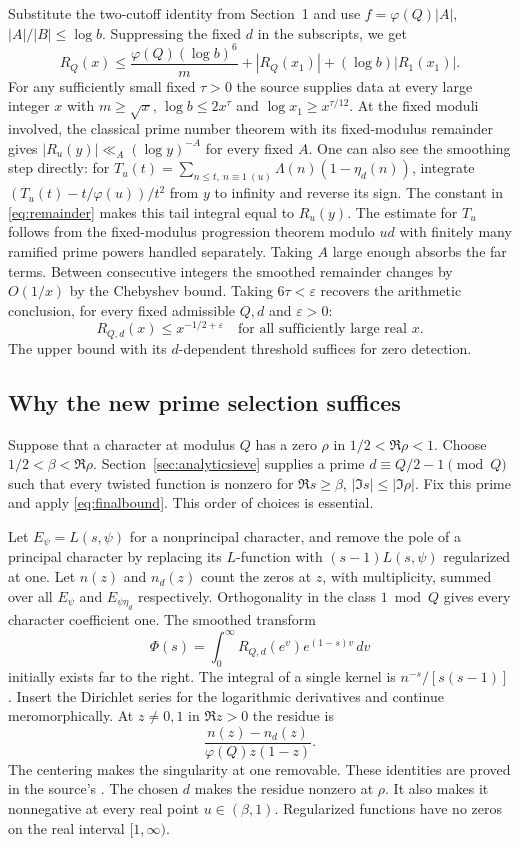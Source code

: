 Substitute the two-cutoff identity from Section~1 and use $f=\varphi(Q)|A|$, $|A|/|B|\le\log b$. Suppressing the fixed $d$ in the subscripts, we get
\[
 R_Q(x)\le\frac{\varphi(Q)(\log b)^6}{m}
                 +|R_Q(x_1)|+(\log b)|R_1(x_1)|.
\]
For any sufficiently small fixed $\tau>0$ the source supplies data at every large integer $x$ with $m\ge\sqrt x$, $\log b\le 2x^\tau$ and $\log x_1\ge x^{\tau/12}$. At the fixed moduli involved, the classical prime number theorem with its fixed-modulus remainder gives $|R_u(y)|\ll_A(\log y)^{-A}$ for every fixed $A$. One can also see the smoothing step directly: for $T_u(t)=\sum_{n\le t,\ n\equiv1\ (u)}\Lambda(n)(1-\eta_d(n))$, integrate $(T_u(t)-t/\varphi(u))/t^2$ from $y$ to infinity and reverse its sign. The constant in \eqref{eq:remainder} makes this tail integral equal to $R_u(y)$. The estimate for $T_u$ follows from the fixed-modulus progression theorem modulo $ud$ with finitely many ramified prime powers handled separately. Taking $A$ large enough absorbs the far terms. Between consecutive integers the smoothed remainder changes by $O(1/x)$ by the Chebyshev bound. Taking $6\tau<\varepsilon$ recovers the arithmetic conclusion, for every fixed admissible $Q,d$ and $\varepsilon>0$:
\begin{equation}
                  R_{Q,d}(x)\le x^{-1/2+\varepsilon}
                     \quad\text{for all sufficiently large real }x.
 \label{eq:finalbound}
\end{equation}
The upper bound with its $d$-dependent threshold suffices for zero detection.

\subsection*{Why the new prime selection suffices}
Suppose that a character at modulus $Q$ has a zero $\rho$ in $1/2<\Re\rho<1$. Choose $1/2<\beta<\Re\rho$. Section~\ref{sec:analyticsieve} supplies a prime $d\equiv Q/2-1\pmod Q$ such that every twisted function is nonzero for $\Re s\ge\beta$, $|\Im s|\le |\Im\rho|$. Fix this prime and apply \eqref{eq:finalbound}. This order of choices is essential.

Let $E_\psi=L(s,\psi)$ for a nonprincipal character, and remove the pole of a principal character by replacing its $L$-function with $(s-1)L(s,\psi)$ regularized at one. Let $n(z)$ and $n_d(z)$ count the zeros at $z$, with multiplicity, summed over all $E_\psi$ and $E_{\psi\eta_d}$ respectively. Orthogonality in the class $1\bmod Q$ gives every character coefficient one. The smoothed transform
\[
 \Phi(s)=\int_0^\infty R_{Q,d}(e^v)e^{(1-s)v}\,dv
\]
initially exists far to the right. The integral of a single kernel is $n^{-s}/[s(s-1)]$. Insert the Dirichlet series for the logarithmic derivatives and continue meromorphically. At $z\ne0,1$ in $\Re z>0$ the residue is
\[
             \frac{n(z)-n_d(z)}{\varphi(Q) z(1-z)}.
\]
The centering makes the singularity at one removable. These identities are proved in the source's . The chosen $d$ makes the residue nonzero at $\rho$. It also makes it nonnegative at every real point $u\in(\beta,1)$. Regularized functions have no zeros on the real interval $[1,\infty)$.

